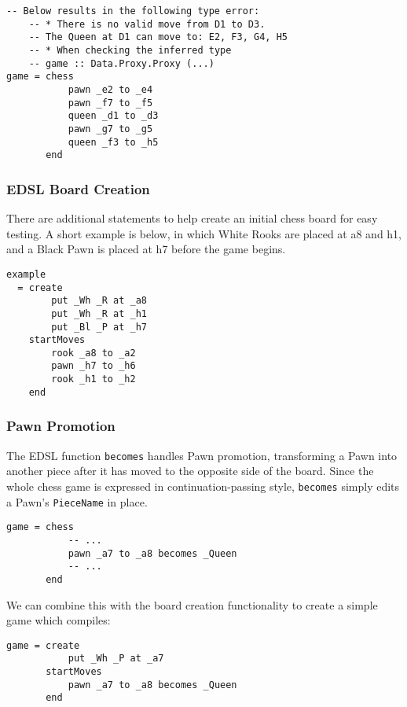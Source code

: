 \documentclass[12pt, a4paper, bibliography=totocnumbered]{scrartcl}
\begin{document}
\begin{lstlisting}
-- Below results in the following type error:
    -- * There is no valid move from D1 to D3.
    -- The Queen at D1 can move to: E2, F3, G4, H5
    -- * When checking the inferred type
    -- game :: Data.Proxy.Proxy (...)
game = chess
           pawn _e2 to _e4
           pawn _f7 to _f5
           queen _d1 to _d3
           pawn _g7 to _g5
           queen _f3 to _h5
       end
\end{lstlisting}

\subsubsection{EDSL Board Creation}

There are additional statements to help create an initial chess board for easy testing. A short example is below, in which White Rooks are placed at a8 and h1, and a Black Pawn is placed at h7 before the game begins.

\begin{lstlisting}
example
  = create                 
        put _Wh _R at _a8
        put _Wh _R at _h1
        put _Bl _P at _h7   
    startMoves           
        rook _a8 to _a2
        pawn _h7 to _h6
        rook _h1 to _h2
    end
\end{lstlisting}

\subsubsection{Pawn Promotion}

The EDSL function \lstinline{becomes} handles Pawn promotion, transforming a Pawn into another piece after it has moved to the opposite side of the board. Since the whole chess game is expressed in continuation-passing style, \lstinline{becomes} simply edits a Pawn's \lstinline{PieceName} in place.

\begin{lstlisting}
game = chess
           -- ...
           pawn _a7 to _a8 becomes _Queen
           -- ...
       end
\end{lstlisting}

We can combine this with the board creation functionality to create a simple game which compiles:

\begin{lstlisting}
game = create
           put _Wh _P at _a7
       startMoves
           pawn _a7 to _a8 becomes _Queen
       end
\end{lstlisting}
\end{document}
